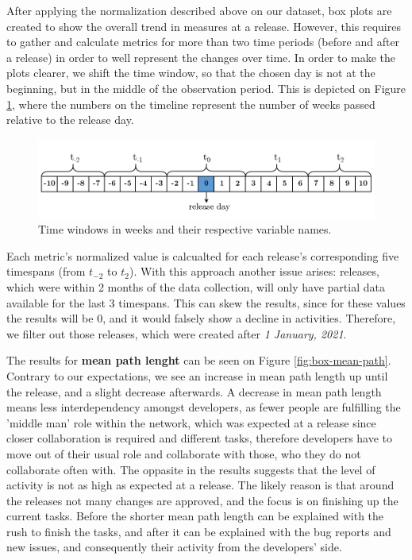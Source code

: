 After applying the normalization described above on our dataset, box plots are created to show the overall trend in measures at a release. However, this requires to gather and calculate metrics for more than two time periods (before and after a release) in order to well represent the changes over time. In order to make the plots clearer, we shift the time window, so that the chosen day is not at the beginning, but in the middle of the observation period. This is depicted on Figure \ref{fig:time-window}, where the numbers on the timeline represent the number of weeks passed relative to the release day.

\begin{figure}
    \centering
    \includegraphics[width=\textwidth]{figures/quantitative/time_window.png}
    \caption{Time windows in weeks and their respective variable names.}
    \label{fig:time-window}
\end{figure}

Each metric's normalized value is calcualted for each release's corresponding five timespans (from $t_{-2}$ to $t_2$). With this approach another issue arises: releases, which were within 2 months of the data collection, will only have partial data available for the last 3 timespans. This can skew the results, since for these values the results will be 0, and it would falsely show a decline in activities. Therefore, we filter out those releases, which were created after \textit{1 January, 2021}.

The results for \textbf{mean path lenght} can be seen on Figure \ref{fig:box-mean-path}. Contrary to our expectations, we see an increase in mean path length up until the release, and a slight decrease afterwards. A decrease in mean path length means less interdependency amongst developers, as fewer people are fulfilling the 'middle man' role within the network, which was expected at a release since closer collaboration is required and different tasks, therefore developers have to move out of their usual role and collaborate with those, who they do not collaborate often with. The oppasite in the results suggests that the level of activity is not as high as expected at a release. The likely reason is that around the releases not many changes are approved, and the focus is on finishing up the current tasks. Before the shorter mean path length can be explained with the rush to finish the tasks, and after it can be explained with the bug reports and new issues, and consequently their activity from the developers' side.

